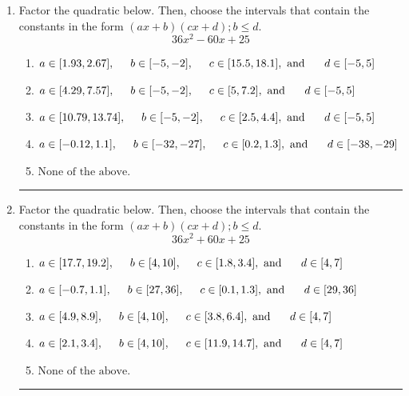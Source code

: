 \documentclass[14pt]{extbook}
\newcommand{\litem}[1]{\item#1\hspace*{-1cm}\rule{\textwidth}{0.4pt}}
\begin{document}
\begin{enumerate}
\litem{
Factor the quadratic below. Then, choose the intervals that contain the constants in the form $(ax+b)(cx+d); b \leq d.$\[ 36x^{2} -60 x + 25 \]\begin{enumerate}[label=\Alph*.]
\item \( a \in [1.93, 2.67], \hspace*{5mm} b \in [-5, -2], \hspace*{5mm} c \in [15.5, 18.1], \text{ and } \hspace*{5mm} d \in [-5, 5] \)
\item \( a \in [4.29, 7.57], \hspace*{5mm} b \in [-5, -2], \hspace*{5mm} c \in [5, 7.2], \text{ and } \hspace*{5mm} d \in [-5, 5] \)
\item \( a \in [10.79, 13.74], \hspace*{5mm} b \in [-5, -2], \hspace*{5mm} c \in [2.5, 4.4], \text{ and } \hspace*{5mm} d \in [-5, 5] \)
\item \( a \in [-0.12, 1.1], \hspace*{5mm} b \in [-32, -27], \hspace*{5mm} c \in [0.2, 1.3], \text{ and } \hspace*{5mm} d \in [-38, -29] \)
\item \( \text{None of the above.} \)

\end{enumerate} }
\litem{
Factor the quadratic below. Then, choose the intervals that contain the constants in the form $(ax+b)(cx+d); b \leq d.$\[ 36x^{2} +60 x + 25 \]\begin{enumerate}[label=\Alph*.]
\item \( a \in [17.7, 19.2], \hspace*{5mm} b \in [4, 10], \hspace*{5mm} c \in [1.8, 3.4], \text{ and } \hspace*{5mm} d \in [4, 7] \)
\item \( a \in [-0.7, 1.1], \hspace*{5mm} b \in [27, 36], \hspace*{5mm} c \in [0.1, 1.3], \text{ and } \hspace*{5mm} d \in [29, 36] \)
\item \( a \in [4.9, 8.9], \hspace*{5mm} b \in [4, 10], \hspace*{5mm} c \in [3.8, 6.4], \text{ and } \hspace*{5mm} d \in [4, 7] \)
\item \( a \in [2.1, 3.4], \hspace*{5mm} b \in [4, 10], \hspace*{5mm} c \in [11.9, 14.7], \text{ and } \hspace*{5mm} d \in [4, 7] \)
\item \( \text{None of the above.} \)


\end{enumerate}}
\end{enumerate}
\end{document}
